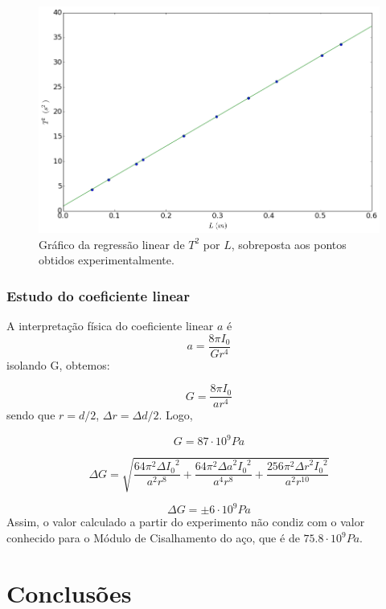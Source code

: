 \documentclass[12pt,a4paper]{article}
\begin{document}
\begin{figure}[!htbp]
 
\includegraphics[scale=0.6]{graf1.png}
\caption{Gráfico da regressão linear de $T^2$ por $L$, sobreposta aos pontos obtidos experimentalmente.} 
\end{figure} 
\subsubsection{Estudo do coeficiente linear}

A interpretação física do coeficiente linear $a$ é 
$$ a = \frac{8\pi I_0}{G r^4}  $$
isolando G, obtemos:

$$ G = \frac{8\pi I_0}{a r^4}  $$
sendo que $r = d/2$, $\Delta r = {\Delta d}/{2} $. Logo,

$$ G =  87 \cdot 10^9 Pa $$

$$ \Delta G = \sqrt{\frac{64 \pi^{2} {\Delta I_0}^{2}}{a^{2} r^{8}} + \frac{64 \pi^{2} {\Delta a}^{2} {I_0}^{2}}{a^{4} r^{8}} + \frac{256 \pi^{2} {\Delta r}^{2} {I_0}^{2}}{a^{2} r^{10}}} $$


$$ \Delta G = \pm 6 \cdot 10^9 Pa$$
Assim, o valor calculado a partir do experimento não condiz com o valor conhecido para o Módulo de Cisalhamento do aço, que é de $75.8 \cdot 10^9 Pa$.








\section{Conclusões}
\end{document}
